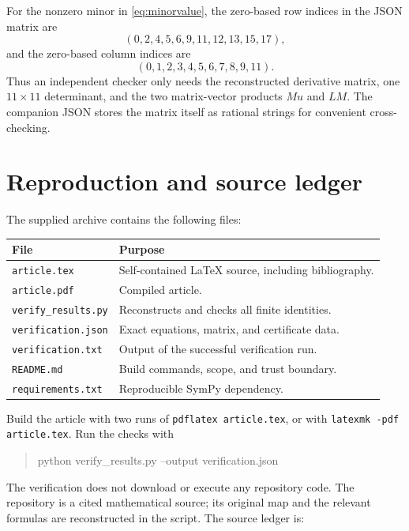 \documentclass[11pt,a4paper]{article}
\numberwithin{equation}{section}
\theoremstyle{definition}
\theoremstyle{remark}
\begin{document}
For the nonzero minor in \eqref{eq:minorvalue}, the zero-based row indices
in the JSON matrix are
\[
(0,2,4,5,6,9,11,12,13,15,17),
\]
and the zero-based column indices are
\[
(0,1,2,3,4,5,6,7,8,9,11).
\]
Thus an independent checker only needs the reconstructed derivative
matrix, one $11\times11$ determinant, and the two matrix-vector products
$Mu$ and $LM$. The companion JSON stores the matrix itself as rational
strings for convenient cross-checking.

\section{Reproduction and source ledger}
\label{app:reproduction}

The supplied archive contains the following files:
\begin{center}
\begin{tabular}{@{}p{}p{}@{}}
\toprule
File & Purpose\\
\midrule
\texttt{article.tex} & Self-contained LaTeX source, including bibliography.\\
\texttt{article.pdf} & Compiled article.\\
\texttt{verify\_results.py} & Reconstructs and checks all finite identities.\\
\texttt{verification.json} & Exact equations, matrix, and certificate data.\\
\texttt{verification.txt} & Output of the successful verification run.\\
\texttt{README.md} & Build commands, scope, and trust boundary.\\
\texttt{requirements.txt} & Reproducible SymPy dependency.\\
\bottomrule
\end{tabular}
\end{center}
Build the article with two runs of \texttt{pdflatex article.tex}, or with
\texttt{latexmk -pdf article.tex}. Run the checks with
\begin{quote}\ttfamily
python verify\_results.py --output verification.json
\end{quote}
The verification does not download or execute any repository code. The
repository is a cited mathematical source; its original map and the
relevant formulas are reconstructed in the script. The source ledger is:
\end{document}
